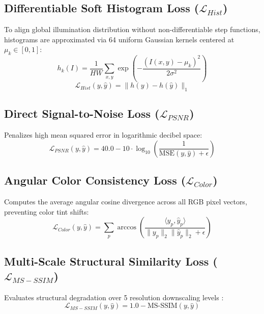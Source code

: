 \documentclass[10pt,twocolumn,letterpaper]{article}
\begin{document}
\subsection{Differentiable Soft Histogram Loss ($\mathcal{L}_{Hist}$)}
To align global illumination distribution without non-differentiable step functions, histograms are approximated via 64 uniform Gaussian kernels centered at $\mu_k \in [0, 1]$:
\begin{equation}
h_k(I) = \frac{1}{HW} \sum_{x, y} \exp\left(-\frac{(I(x, y) - \mu_k)^2}{2\sigma^2}\right)
\end{equation}
\begin{equation}
\mathcal{L}_{Hist}(y, \hat{y}) = \|h(y) - h(\hat{y})\|_1
\end{equation}

\subsection{Direct Signal-to-Noise Loss ($\mathcal{L}_{PSNR}$)}
Penalizes high mean squared error in logarithmic decibel space:
\begin{equation}
\mathcal{L}_{PSNR}(y, \hat{y}) = 40.0 - 10 \cdot \log_{10}\left(\frac{1}{\text{MSE}(y, \hat{y}) + \epsilon}\right)
\end{equation}

\subsection{Angular Color Consistency Loss ($\mathcal{L}_{Color}$)}
Computes the average angular cosine divergence across all RGB pixel vectors, preventing color tint shifts:
\begin{equation}
\mathcal{L}_{Color}(y, \hat{y}) = \sum_p \arccos\left(\frac{\langle y_p, \hat{y}_p \rangle}{\|y_p\|_2 \|\hat{y}_p\|_2 + \epsilon}\right)
\end{equation}

\subsection{Multi-Scale Structural Similarity Loss ($\mathcal{L}_{MS-SSIM}$)}
Evaluates structural degradation over 5 resolution downscaling levels \cite{wang2003multiscale}:
\begin{equation}
\mathcal{L}_{MS-SSIM}(y, \hat{y}) = 1.0 - \text{MS-SSIM}(y, \hat{y})
\end{equation}
\end{document}
